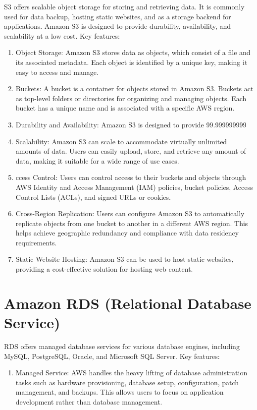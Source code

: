 \documentclass[11pt,a4paper,oneside]{report}
\begin{document}
S3 offers scalable object storage for storing and retrieving data. It is commonly used for data backup, hosting static websites, and as a storage backend for applications.
Amazon S3 is designed to provide durability, availability, and scalability at a low cost.
Key features:
\begin{enumerate}
  \item Object Storage: Amazon S3 stores data as objects, which consist of a file and its associated metadata. Each object is identified by a unique key, making it easy to access and manage.
  \item Buckets: A bucket is a container for objects stored in Amazon S3. Buckets act as top-level folders or directories for organizing and managing objects. Each bucket has a unique name and is associated with a specific AWS region.
  \item Durability and Availability: Amazon S3 is designed to provide 99.999999999%
  \item Scalability: Amazon S3 can scale to accommodate virtually unlimited amounts of data. Users can easily upload, store, and retrieve any amount of data, making it suitable for a wide range of use cases.
  \item ccess Control: Users can control access to their buckets and objects through AWS Identity and Access Management (IAM) policies, bucket policies, Access Control Lists (ACLs), and signed URLs or cookies.
  \item Cross-Region Replication: Users can configure Amazon S3 to automatically replicate objects from one bucket to another in a different AWS region. This helps achieve geographic redundancy and compliance with data residency requirements.
  \item Static Website Hosting: Amazon S3 can be used to host static websites, providing a cost-effective solution for hosting web content. \cite{awss3}
\end{enumerate}


\section{Amazon RDS (Relational Database Service)}

RDS offers managed database services for various database engines, including MySQL, PostgreSQL, Oracle, and Microsoft SQL Server.
Key features:
\begin{enumerate}
  \item Managed Service: AWS handles the heavy lifting of database administration tasks such as hardware provisioning, database setup, configuration, patch management, and backups. This allows users to focus on application development rather than database management. \cite{awsrds}
\end{enumerate}
\end{document}
